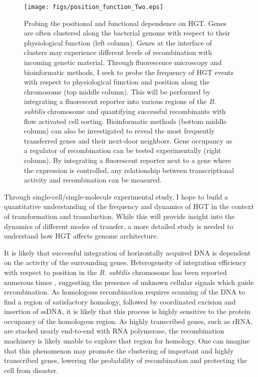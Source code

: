 \begin{figure}
	\centerline{
		\texttt{[image: figs/position\_function\_Two.eps]}}

	\caption{Probing the positional and functional dependence on HGT. Genes
		are often clustered along the bacterial genome with respect to
		their physiological function (left column). Genes at the
		interface of clusters may experience different levels of
		recombination with incoming genetic material. Through
		fluorescence microscopy and bioinformatic methods, I seek to
		probe the frequency of HGT events with respect to physiological
		function and position along the chromosome (top middle column).
		This will be performed by integrating a fluorescent reporter
		into various regions of the \textit{B. subtilis} chromosome and
		quantifying successful recombinants with  flow activated cell
		sorting. Bioinformatic methods (bottom middle column) can also
		be investigated to reveal the most frequently transferred genes
		and their next-door neighbors. Gene occupancy as a regulator of
		recombination can be tested experimentally (right column). By
		integrating a fluorescent reporter next to a gene where the
		expression is controlled, any relationship
		between transcriptional activity and recombination can be measured.}

	\label{ref:postion_function}

\end{figure}

\indent Through single-cell/single-molecule experimental study, I hope to build a
quantitative understanding of the frequency and dynamics of HGT in the context
of transformation and transduction. While this will provide insight into the
dynamics of different modes of transfer, a more detailed study is needed to
understand how HGT affects genome architecture. 

It is likely that successful integration of horizontally acquired DNA is
dependent on the activity of the surrounding genes. Heterogeneity of integration
efficiency with respect to position in the \textit{B. subtilis} chromosome has
been reported numerous times \cite{Biswas:1992tt, Tomita:2014jn}, suggesting
the presence of unknown cellular signals which guide recombination. As
homologous recombination requires scanning of the DNA to find a region of
satisfactory homology, followed by coordinated excision and insertion of ssDNA,
it is likely that this process is highly sensitive to the protein occupancy of
the homologous region. As highly transcribed genes, such as rRNA, are stacked
nearly end-to-end with RNA polymerase, the recombination machinery is likely
unable to explore that region for homology. One can imagine that this phenomenon
may promote the clustering of important and highly transcribed genes, lowering
the probability of recombination and protecting the cell from disaster.

